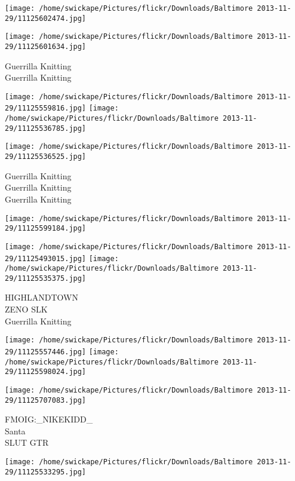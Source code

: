 \documentclass[10pt,letterpaper]{article}
\begin{document}
\texttt{[image: /home/swickape/Pictures/flickr/Downloads/Baltimore 2013-11-29/11125602474.jpg]}

\vspace{0.25in}
\texttt{[image: /home/swickape/Pictures/flickr/Downloads/Baltimore 2013-11-29/11125601634.jpg]}

Guerrilla Knitting\\
Guerrilla Knitting\\
\pagebreak

\texttt{[image: /home/swickape/Pictures/flickr/Downloads/Baltimore 2013-11-29/11125559816.jpg]}
\texttt{[image: /home/swickape/Pictures/flickr/Downloads/Baltimore 2013-11-29/11125536785.jpg]}

\texttt{[image: /home/swickape/Pictures/flickr/Downloads/Baltimore 2013-11-29/11125536525.jpg]}

Guerrilla Knitting\\
Guerrilla Knitting\\
Guerrilla Knitting\\
\pagebreak

\texttt{[image: /home/swickape/Pictures/flickr/Downloads/Baltimore 2013-11-29/11125599184.jpg]}

\vspace{0.25in}
\texttt{[image: /home/swickape/Pictures/flickr/Downloads/Baltimore 2013-11-29/11125493015.jpg]}
\texttt{[image: /home/swickape/Pictures/flickr/Downloads/Baltimore 2013-11-29/11125535375.jpg]}

HIGHLANDTOWN\\
ZENO SLK\\
Guerrilla Knitting\\
\pagebreak

\texttt{[image: /home/swickape/Pictures/flickr/Downloads/Baltimore 2013-11-29/11125557446.jpg]}
\texttt{[image: /home/swickape/Pictures/flickr/Downloads/Baltimore 2013-11-29/11125598024.jpg]}

\texttt{[image: /home/swickape/Pictures/flickr/Downloads/Baltimore 2013-11-29/11125707083.jpg]}

FMOIG:\_NIKEKIDD\_\\
Santa\\
SLUT GTR\\
\pagebreak

\texttt{[image: /home/swickape/Pictures/flickr/Downloads/Baltimore 2013-11-29/11125533295.jpg]}
\end{document}
